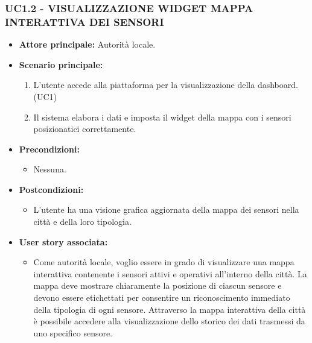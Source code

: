 \subsubsection{UC1.2 - VISUALIZZAZIONE WIDGET MAPPA INTERATTIVA DEI SENSORI}
\begin{itemize}
    \item \textbf{Attore principale:} Autorità locale.
    \item \textbf{Scenario principale:}
        \begin{enumerate}
            \item L'utente accede alla piattaforma per la visualizzazione della dashboard. (UC1)
            \item Il sistema elabora i dati e imposta il widget della mappa con i sensori posizionatici correttamente.
        \end{enumerate}
    \item \textbf{Precondizioni:}
        \begin{itemize}
            \item  Nessuna.
        \end{itemize}
    \item \textbf{Postcondizioni:}
        \begin{itemize}
            \item L'utente ha una visione grafica aggiornata della mappa dei sensori nella città e della loro tipologia.
        \end{itemize}
    \item \textbf{User story associata:}
        \begin{itemize}
            \item Come autorità locale, voglio essere in grado di visualizzare una mappa interattiva contenente i sensori attivi e operativi all'interno della città. La mappa deve mostrare chiaramente la posizione di ciascun sensore e devono essere etichettati per consentire un riconoscimento immediato della tipologia di ogni sensore.
            Attraverso la mappa interattiva della città è possibile accedere alla visualizzazione dello storico dei dati trasmessi da uno specifico sensore.
        \end{itemize}
\end{itemize}